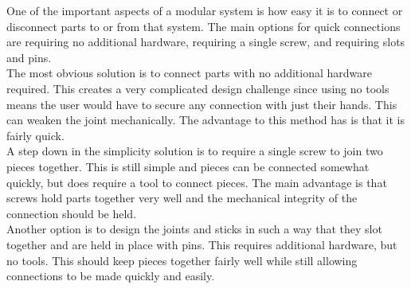 One of the important aspects of a modular system is how easy it is to connect or disconnect parts to or from that system. The main options for quick connections are requiring no additional hardware, requiring a single screw, and requiring slots and pins. \\
\newline
The most obvious solution is to connect parts with no additional hardware required. This creates a very complicated design challenge since using no tools means the user would have to secure any connection with just their hands. This can weaken the joint mechanically. The advantage to this method has is that it is fairly quick. \\ 
\newline
A step down in the simplicity solution is to require a single screw to join two pieces together. This is still simple and pieces can be connected somewhat quickly, but does require a tool to connect pieces. The main advantage is that screws hold parts together very well and the mechanical integrity of the connection should be held. \\
\newline
Another option is to design the joints and sticks in such a way that they slot together and are held in place with pins. This requires additional hardware, but no tools. This should keep pieces together fairly well while still allowing connections to be made quickly and easily. \\
\newline


